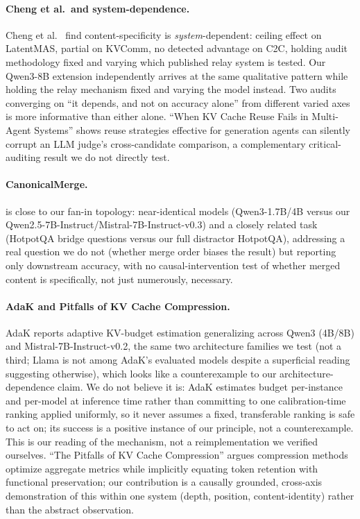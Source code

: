 \documentclass[11pt]{article}
\begin{document}
\paragraph{Cheng et al.\ and system-dependence.} Cheng et al.\
\citep{latentcommpay2026} find content-specificity is
\emph{system}-dependent: ceiling effect on LatentMAS, partial on
KVComm, no detected advantage on C2C, holding audit methodology fixed
and varying which published relay system is tested. Our Qwen3-8B
extension independently arrives at the same qualitative pattern while
holding the relay mechanism fixed and varying the model instead. Two
audits converging on ``it depends, and not on accuracy alone'' from
different varied axes is more informative than either alone. ``When KV
Cache Reuse Fails in Multi-Agent Systems'' \citep{kvreusefails2026}
shows reuse strategies effective for generation agents can silently
corrupt an LLM judge's cross-candidate comparison, a complementary
critical-auditing result we do not directly test.

\paragraph{CanonicalMerge.} \citep{canonicalmerge2026} is close to our
fan-in topology: near-identical models (Qwen3-1.7B/4B versus our
Qwen2.5-7B-Instruct/Mistral-7B-Instruct-v0.3) and a closely related task
(HotpotQA bridge questions versus our full distractor HotpotQA),
addressing a real question we do not (whether merge order biases the
result) but reporting only downstream accuracy, with no
causal-intervention test of whether merged content is specifically, not
just numerously, necessary.

\paragraph{AdaK and Pitfalls of KV Cache Compression.} AdaK
\citep{adak2026} reports adaptive KV-budget estimation generalizing
across Qwen3 (4B/8B) and Mistral-7B-Instruct-v0.2, the same two
architecture families we test (not a third; Llama is not among AdaK's
evaluated models despite a superficial reading suggesting otherwise),
which looks like a counterexample to our architecture-dependence claim.
We do not believe it is: AdaK estimates budget per-instance and
per-model at inference time rather than committing to one
calibration-time ranking applied uniformly, so it never assumes a
fixed, transferable ranking is safe to act on; its success is a
positive instance of our principle, not a counterexample. This is our
reading of the mechanism, not a reimplementation we verified ourselves.
``The Pitfalls of KV Cache Compression'' \citep{pitfallskv2026} argues
compression methods optimize aggregate metrics while implicitly
equating token retention with functional preservation; our contribution
is a causally grounded, cross-axis demonstration of this within one
system (depth, position, content-identity) rather than the abstract
observation.
\end{document}
